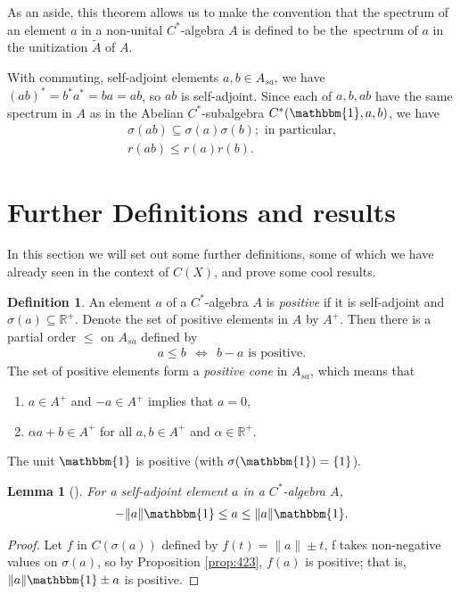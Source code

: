 \documentclass[12pt,a4paper]{report}
\theoremstyle{plain}
\newtheorem{lemma}{Lemma}
\theoremstyle{definition}
\newtheorem{defn}{Definition}
\newcommand{\1}{\mathbbm{1}}
\newcommand{\R}{\mathbb{R}}
\newcommand{\CX}{C(X)}
\newcommand{\spec}[1]{\sigma(#1)}
\begin{document}
As an aside, this theorem allows us to make the convention that the spectrum of an element $a$ in a 
non-unital $C^\ast$-algebra $A$ is defined to be the~spectrum of $a$ in the unitization $\tilde A$ 
of $A$.



With commuting, self-adjoint elements $a,b\in A_{sa}$, we have $(ab)^\ast = b^\ast a^\ast = ba =
ab$, so $ab$ is self-adjoint. Since each of $a,b,ab$ have the same spectrum in $A$ as in the Abelian 
$C^\ast$-subalgebra $C^\ast(\1,a,b)$, we have
\begin{align*}
	\spec{ab} \subseteq \spec{a}\spec{b}; \mbox { in particular,} \\
	r(ab) \leq r(a)r(b).
\end{align*}


\section{Further Definitions and results}
In this section we will set out some further definitions, some of which we have already seen in the context of $\CX$, and prove some cool results.

\begin{defn}
	An element $a$ of a $C^\ast$-algebra $A$ is \emph{positive} if it is self-adjoint and $\spec a
	\subseteq \R^+$. 
	Denote the set of positive elements in $A$ by $A^+$. Then there is a partial order $\leq$ on 
	$A_{sa}$ defined by 
	\begin{align*}
		a\leq b ~~\iff~~ b-a \mbox{ is positive}.
	\end{align*}
	The set of positive elements form a \emph{positive cone} in $A_{sa}$, which means that 
	\begin{enumerate}
		\item 	$a\in A^+$ and $-a\in A^+$ implies that $a=0$,
		\item	$\alpha a+b\in A^+$ for all $a,b \in A^+$ and $\alpha\in \R^+$.
	\end{enumerate}
\end{defn}

The unit $\1$ is positive (with $\spec \1 = \{1\}$). 

\begin{lemma}[{\cite[4.2.3(ii)]{kadison83}}]\label{lemma:423}
	For a self-adjoint element $a$ in a $C^\ast$-algebra $A$, 
	\begin{align*}
		-\|a\|\1\leq a\leq\|a\|\1.
	\end{align*}
\end{lemma}
\begin{proof}
	Let $f$ in $C(\spec a)$ defined by $f(t) = \|a\| \pm t$, f takes non-negative values on $\spec a$, so by Proposition \ref{prop:423}, $f(a)$ is positive; that is, $\|a\|\1 \pm a$ is positive.
\end{proof}
	
\end{document}
